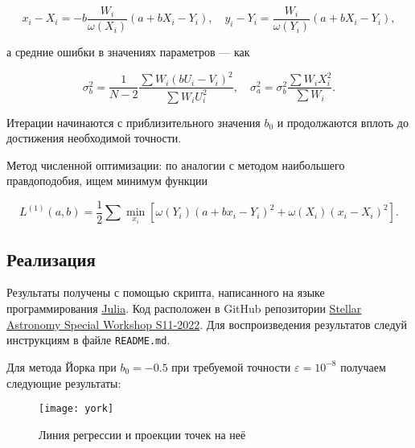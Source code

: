 \documentclass[a4paper, oneside]{article}
\newcommand{\su}{\vspace{-0.5em}}
\newcommand{\npar}{\par\vspace{\baselineskip}}
\begin{document}
\su
\begin{equation}
  x_i - X_i = -b \frac{W_i}{\omega(X_i)} (a + b X_i - Y_i), \quad
  y_i - Y_i = \frac{W_i}{\omega(Y_i)} (a + b X_i - Y_i),
\end{equation}

а средние ошибки в значениях параметров --- как

\su
\begin{equation}
  \sigma_b^2 = \frac{1}{N - 2} \frac{\sum W_i (b U_i - V_i)^2}{\sum W_i U_i^2}, \quad
  \sigma_a^2 = \sigma_b^2 \frac{\sum W_i X_i^2}{\sum W_i}.
\end{equation}

Итерации начинаются с приблизительного значения $ b_0 $ и продолжаются вплоть до достижения необходимой точности.

\vspace{\baselineskip}

Метод численной оптимизации: по аналогии с методом наибольшего правдоподобия, ищем минимум функции

\su
\begin{equation}
  L^{(1)}(a, b) = \frac{1}{2} \sum \min_{x_i} \left[ \omega(Y_i) (a + b x_i - Y_i)^2 + \omega(X_i) (x_i - X_i)^2 \right].
\end{equation}

\subsection*{Реализация}

Результаты получены с помощью скрипта, написанного на языке программирования \href{https://julialang.org}{Julia}. Код расположен в GitHub репозитории \href{https://github.com/paveloom-university/Stellar-Astronomy-Special-Workshop-S11-2022}{Stellar Astronomy Special Workshop S11-2022}. Для воспроизведения результатов следуй инструкциям в файле {\footnotesize \texttt{README.md}}. \npar

Для метода Йорка при $ b_0 = -0.5 $ при требуемой точности $ \varepsilon = 10^{-8} $ получаем следующие результаты:




\captionsetup{justification=centering}

\begin{figure}[h!]
  \centering
  \texttt{[image: york]}
  \caption{Линия регрессии и проекции точек на неё}
\end{figure}

\newpage
\end{document}
